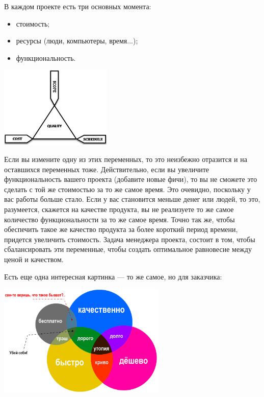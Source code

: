 \documentclass{../../text-style}
\begin{document}
В каждом проекте есть три основных момента:

\begin{itemize}
    \item стоимость;
    \item ресурсы (люди, компьютеры, время...);
    \item функциональность.
\end{itemize}

\begin{center}
    \includegraphics[width=0.4\textwidth]{balanceTriangle.png}
\end{center}

Если вы измените одну из этих переменных, то это неизбежно отразится и на оставшихся переменных тоже. Действительно, если вы увеличите функциональность вашего проекта (добавите новые фичи), то вы не сможете это сделать с той же стоимостью за то же самое время. Это очевидно, поскольку у вас работы больше стало. Если у вас становится меньше денег или людей, то это, разумеется, скажется на качестве продукта, вы не реализуете то же самое количество функциональности за то же самое время. Точно так же, чтобы обеспечить такое же качество продукта за более короткий период времени, придется увеличить стоимость. Задача менеджера проекта, состоит в том, чтобы сбалансировать эти переменные, чтобы создать оптимальное равновесие между ценой и качеством.

Есть еще одна интересная картинка --- то же самое, но для заказчика:

\begin{center}
    \includegraphics[width=0.6\textwidth]{balanceTriangleExplained.png}
\end{center}
\end{document}
